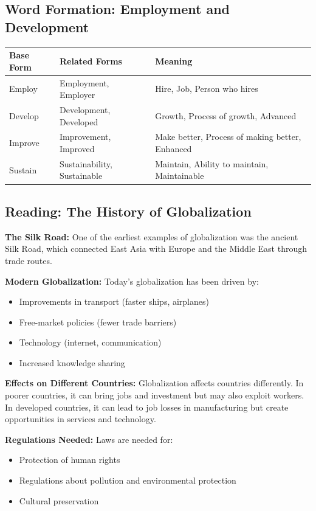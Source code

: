 \subsection{Word Formation: Employment and Development}

\begin{table}[h]
\centering
\begin{tabular}{|l|l|l|}
\hline
\textbf{Base Form} & \textbf{Related Forms} & \textbf{Meaning} \\
\hline
Employ & Employment, Employer & Hire, Job, Person who hires \\
\hline
Develop & Development, Developed & Growth, Process of growth, Advanced \\
\hline
Improve & Improvement, Improved & Make better, Process of making better, Enhanced \\
\hline
Sustain & Sustainability, Sustainable & Maintain, Ability to maintain, Maintainable \\
\hline
\end{tabular}
\end{table}

\subsection{Reading: The History of Globalization}

\begin{readingbox}[title=Globalization Through History]
\textbf{The Silk Road:} One of the earliest examples of globalization was the ancient Silk Road, which connected East Asia with Europe and the Middle East through trade routes.

\textbf{Modern Globalization:} Today's globalization has been driven by:
\begin{itemize}
    \item Improvements in transport (faster ships, airplanes)
    \item Free-market policies (fewer trade barriers)
    \item Technology (internet, communication)
    \item Increased knowledge sharing
\end{itemize}

\textbf{Effects on Different Countries:} Globalization affects countries differently. In poorer countries, it can bring jobs and investment but may also exploit workers. In developed countries, it can lead to job losses in manufacturing but create opportunities in services and technology.

\textbf{Regulations Needed:} Laws are needed for:
\begin{itemize}
    \item Protection of human rights
    \item Regulations about pollution and environmental protection
    \item Cultural preservation
\end{itemize}
\end{readingbox}

